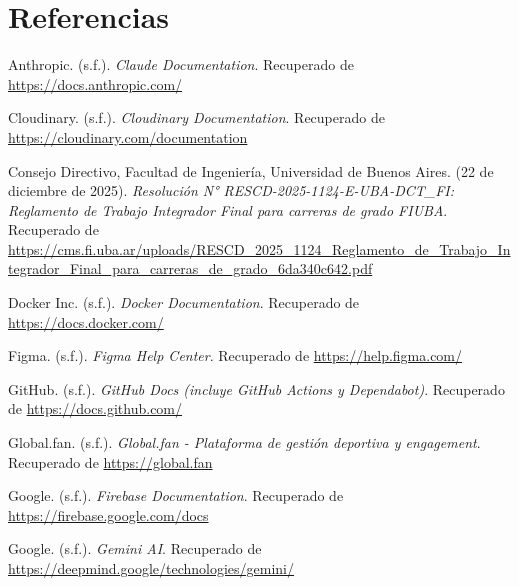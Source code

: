 \section{Referencias}

\begingroup
\sloppy
\vspace{0.5cm}
\setlength{\parindent}{0cm} 

\hangindent=1.25cm
Anthropic. (s.f.). \textit{Claude Documentation}. Recuperado de \url{https://docs.anthropic.com/}
\vspace{0.4cm}

\hangindent=1.25cm
Cloudinary. (s.f.). \textit{Cloudinary Documentation}. Recuperado de \url{https://cloudinary.com/documentation}
\vspace{0.4cm}

\hangindent=1.25cm
Consejo Directivo, Facultad de Ingeniería, Universidad de Buenos Aires. (22 de diciembre de 2025). \textit{Resolución N° RESCD-2025-1124-E-UBA-DCT\_FI: Reglamento de Trabajo Integrador Final para carreras de grado FIUBA}. Recuperado de \url{https://cms.fi.uba.ar/uploads/RESCD_2025_1124_Reglamento_de_Trabajo_Integrador_Final_para_carreras_de_grado_6da340c642.pdf}
\vspace{0.4cm}

\hangindent=1.25cm
Docker Inc. (s.f.). \textit{Docker Documentation}. Recuperado de \url{https://docs.docker.com/}
\vspace{0.4cm}

\hangindent=1.25cm
Figma. (s.f.). \textit{Figma Help Center}. Recuperado de \url{https://help.figma.com/}
\vspace{0.4cm}

\hangindent=1.25cm
GitHub. (s.f.). \textit{GitHub Docs (incluye GitHub Actions y Dependabot)}. Recuperado de \url{https://docs.github.com/}
\vspace{0.4cm}

\hangindent=1.25cm
Global.fan. (s.f.). \textit{Global.fan - Plataforma de gestión deportiva y engagement}. Recuperado de \url{https://global.fan}
\vspace{0.4cm}

\hangindent=1.25cm
Google. (s.f.). \textit{Firebase Documentation}. Recuperado de \url{https://firebase.google.com/docs}
\vspace{0.4cm}

\hangindent=1.25cm
Google. (s.f.). \textit{Gemini AI}. Recuperado de \url{https://deepmind.google/technologies/gemini/}
\vspace{0.4cm}

